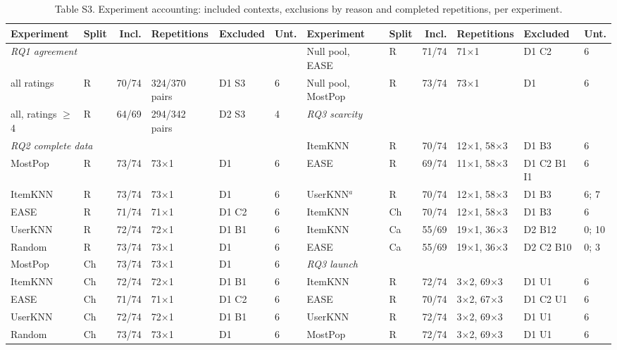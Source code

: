 \begin{table}[H]
\caption{Table S3. Experiment accounting: included contexts, exclusions by reason and completed repetitions, per experiment.}
\centering\scriptsize\setlength{\tabcolsep}{1.9pt}
\begin{tabular}{llrlll@{\hspace{8pt}}llrlll}
\toprule
Experiment & Split & Incl. & Repetitions & Excluded & Unt. & Experiment & Split & Incl. & Repetitions & Excluded & Unt. \\
\midrule
\multicolumn{6}{l}{\emph{RQ1 agreement}} & Null pool, EASE & R & 71/74 & 71$\times$1 & D1 C2 & 6 \\
all ratings & R & 70/74 & 324/370 pairs & D1 S3 & 6 & Null pool, MostPop & R & 73/74 & 73$\times$1 & D1 & 6 \\
all, ratings $\geq$4 & R & 64/69 & 294/342 pairs & D2 S3 & 4 & \multicolumn{6}{l}{\emph{RQ3 scarcity}} \\
\multicolumn{6}{l}{\emph{RQ2 complete data}} & ItemKNN & R & 70/74 & 12$\times$1, 58$\times$3 & D1 B3 & 6 \\
MostPop & R & 73/74 & 73$\times$1 & D1 & 6 & EASE & R & 69/74 & 11$\times$1, 58$\times$3 & D1 C2 B1 I1 & 6 \\
ItemKNN & R & 73/74 & 73$\times$1 & D1 & 6 & UserKNN$^a$ & R & 70/74 & 12$\times$1, 58$\times$3 & D1 B3 & 6; 7 \\
EASE & R & 71/74 & 71$\times$1 & D1 C2 & 6 & ItemKNN & Ch & 70/74 & 12$\times$1, 58$\times$3 & D1 B3 & 6 \\
UserKNN & R & 72/74 & 72$\times$1 & D1 B1 & 6 & ItemKNN & Ca & 55/69 & 19$\times$1, 36$\times$3 & D2 B12 & 0; 10 \\
Random & R & 73/74 & 73$\times$1 & D1 & 6 & EASE & Ca & 55/69 & 19$\times$1, 36$\times$3 & D2 C2 B10 & 0; 3 \\
MostPop & Ch & 73/74 & 73$\times$1 & D1 & 6 & \multicolumn{6}{l}{\emph{RQ3 launch}} \\
ItemKNN & Ch & 72/74 & 72$\times$1 & D1 B1 & 6 & ItemKNN & R & 72/74 & 3$\times$2, 69$\times$3 & D1 U1 & 6 \\
EASE & Ch & 71/74 & 71$\times$1 & D1 C2 & 6 & EASE & R & 70/74 & 3$\times$2, 67$\times$3 & D1 C2 U1 & 6 \\
UserKNN & Ch & 72/74 & 72$\times$1 & D1 B1 & 6 & UserKNN & R & 72/74 & 3$\times$2, 69$\times$3 & D1 U1 & 6 \\
Random & Ch & 73/74 & 73$\times$1 & D1 & 6 & MostPop & R & 72/74 & 3$\times$2, 69$\times$3 & D1 U1 & 6 \\

\end{tabular}
\end{table}
